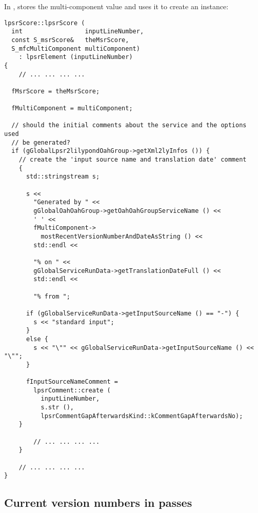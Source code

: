 In ,  stores the multi-component value and uses it to create an  instance:
\begin{lstlisting}[language=CPlusPlus]
lpsrScore::lpsrScore (
  int                 inputLineNumber,
  const S_msrScore&   theMsrScore,
  S_mfcMultiComponent multiComponent)
    : lpsrElement (inputLineNumber)
{
	// ... ... ... ...

  fMsrScore = theMsrScore;

  fMultiComponent = multiComponent;

  // should the initial comments about the service and the options used
  // be generated?
  if (gGlobalLpsr2lilypondOahGroup->getXml2lyInfos ()) {
    // create the 'input source name and translation date' comment
    {
      std::stringstream s;

      s <<
        "Generated by " <<
        gGlobalOahOahGroup->getOahOahGroupServiceName () <<
        ' ' <<
        fMultiComponent->
          mostRecentVersionNumberAndDateAsString () <<
        std::endl <<

        "% on " <<
        gGlobalServiceRunData->getTranslationDateFull () <<
        std::endl <<

        "% from ";

      if (gGlobalServiceRunData->getInputSourceName () == "-") {
        s << "standard input";
      }
      else {
        s << "\"" << gGlobalServiceRunData->getInputSourceName () << "\"";
      }

      fInputSourceNameComment =
        lpsrComment::create (
          inputLineNumber,
          s.str (),
          lpsrCommentGapAfterwardsKind::kCommentGapAfterwardsNo);
    }

	 	// ... ... ... ...
 	}

 	// ... ... ... ...
}
\end{lstlisting}


\subsection{Current version numbers in passes}\label{Current version numbers in passes}

